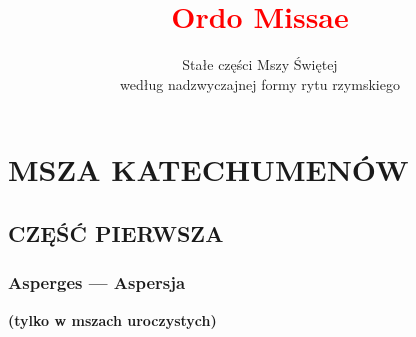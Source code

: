 \documentclass[8pt,titlepage]{article}
\title{\textcolor{red}{Ordo Missae}}
\author{Stałe części Mszy Świętej\\według nadzwyczajnej formy rytu rzymskiego }
\date{}
\begin{document}
	\maketitle
	\clearpage
	\tableofcontents
	\clearpage
	
	\section{MSZA KATECHUMENÓW}
	
	\subsection{CZĘŚĆ PIERWSZA}
	
	\subsubsection{Asperges --- Aspersja}
	\textbf{(tylko w mszach uroczystych)}
	
\end{document}

